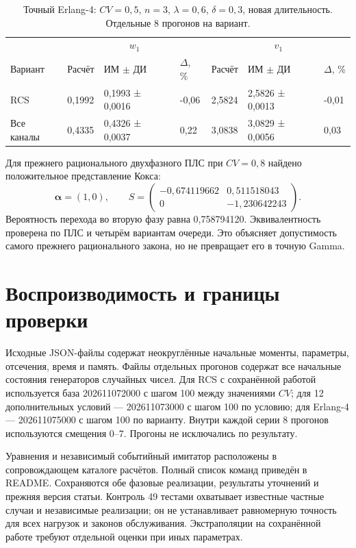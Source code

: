 \documentclass[a4paper,12pt]{article}
\begin{document}
\begin{table}[!htbp]
\centering\small\setlength{\tabcolsep}{2pt}
\begin{tabular}{@{}p{4.16cm}p{1.61cm}p{2.83cm}p{1.28cm}p{1.61cm}p{2.83cm}p{1.28cm}@{}}
\toprule
 & \multicolumn{3}{c}{$w_1$} & \multicolumn{3}{c}{$v_1$} \\
Вариант & Расчёт & ИМ $\pm$ ДИ & $\Delta$, \% & Расчёт & ИМ $\pm$ ДИ & $\Delta$, \% \\
\midrule
RCS & 0,1992 & 0,1993 ± 0,0016 & -0,06 & 2,5824 & 2,5826 ± 0,0013 & -0,01 \\
Все каналы & 0,4335 & 0,4326 ± 0,0037 & 0,22 & 3,0838 & 3,0829 ± 0,0056 & 0,03 \\
\bottomrule
\end{tabular}
\caption{Точный Erlang-4: \(CV=0{,}5\), \(n=3\), \(\lambda=0{,}6\), \(\delta=0{,}3\), новая длительность. Отдельные 8 прогонов на вариант.}
\label{tab:erlang}
\end{table}

Для прежнего рационального двухфазного ПЛС при \(CV=0{,}8\) найдено положительное представление Кокса:
\[
\boldsymbol\alpha=(1,0),\qquad
S=\begin{pmatrix}-0{,}674119662&0{,}511518043\\0&-1{,}230642243\end{pmatrix}.
\]
Вероятность перехода во вторую фазу равна 0{,}758794120. Эквивалентность проверена по ПЛС и четырём вариантам очереди. Это объясняет допустимость самого прежнего рационального закона, но не превращает его в точную Gamma.

\section{Воспроизводимость и границы проверки}
Исходные JSON-файлы содержат неокруглённые начальные моменты, параметры, отсечения, время и память. Файлы отдельных прогонов содержат все начальные состояния генераторов случайных чисел. Для RCS с сохранённой работой используется база 202611072000 с шагом 100 между значениями \(CV\); для 12 дополнительных условий --- 202611073000 с шагом 100 по условию; для Erlang-4 --- 202611075000 с шагом 100 по варианту. Внутри каждой серии 8 прогонов используются смещения 0--7. Прогоны не исключались по результату.

Уравнения и независимый событийный имитатор расположены в сопровождающем каталоге расчётов. Полный список команд приведён в README. Сохраняются обе фазовые реализации, результаты уточнений и прежняя версия статьи. Контроль 49 тестами охватывает известные частные случаи и независимые реализации; он не устанавливает равномерную точность для всех нагрузок и законов обслуживания. Экстраполяции на сохранённой работе требуют отдельной оценки при иных параметрах.
\end{document}
